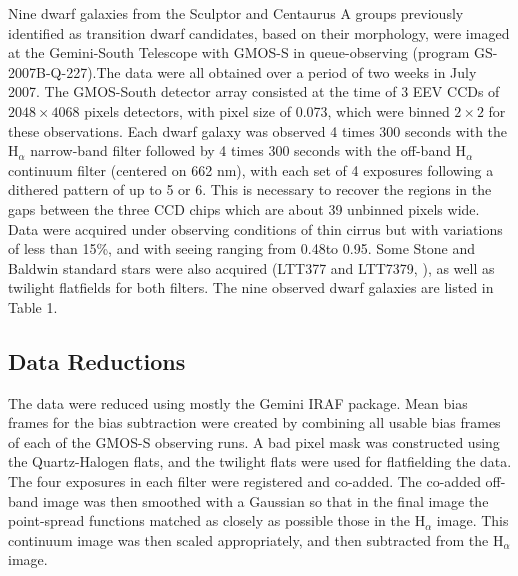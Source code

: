 \documentclass[12pt,preprint]{aastex}
\begin{document}
Nine dwarf galaxies from the Sculptor and Centaurus A groups previously identified as transition dwarf candidates, based on their morphology,  were 
imaged at the Gemini-South Telescope with GMOS-S in queue-observing (program GS-2007B-Q-227).The data were all obtained over a period of two 
weeks in July 2007. The GMOS-South detector array consisted at the time of 3 EEV CCDs of $2048\times 4068$ pixels detectors, with pixel size of 
0.073\arcsec, which were binned $2\times 2$ for these observations. Each dwarf galaxy was observed 4 times 300 seconds with the H$_\alpha$ 
narrow-band filter followed by 4 times 300 seconds with the off-band H$_\alpha$ continuum filter (centered on 662 nm), with each set of 4 exposures 
following a dithered pattern of up to 5 or 6\arcsec. This is necessary to recover the regions in the gaps between the three CCD chips which are about 
39 unbinned pixels wide. Data were acquired under observing conditions of thin cirrus but with variations of less than 15\%, and with seeing ranging 
from 0.48\arcsec to 0.95\arcsec. Some Stone and Baldwin standard stars were also acquired (LTT377 and LTT7379, \cite{sb83}), as well as twilight 
flatfields for both filters. The nine observed dwarf galaxies are listed in Table 1.

\subsection{Data Reductions}

The data were reduced using mostly the Gemini IRAF package. Mean bias frames for the bias subtraction were created by combining all usable bias 
frames of each of the GMOS-S observing runs. A bad pixel mask was constructed using the Quartz-Halogen flats, and the twilight flats were used for 
flatfielding the data. The four exposures in each filter were registered and co-added. The co-added off-band image was then smoothed with a Gaussian 
so that in the final image the point-spread functions matched as closely as possible those in the H$_\alpha$ image. This continuum image was then scaled 
appropriately, and then subtracted from the H$_\alpha$ image. 
\end{document}
